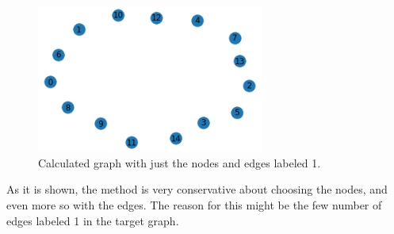 \begin{figure}[!ht]
	\centering
	\includegraphics[width=75mm, keepaspectratio]{figures/calculated.png}
	\caption{Calculated graph with just the nodes and edges labeled 1.}
	\label{fig:calculated}
\end{figure}

As it is shown, the method is very conservative about choosing the nodes, and even more so with the edges. The reason for this might be the few number of edges labeled 1 in the target graph.